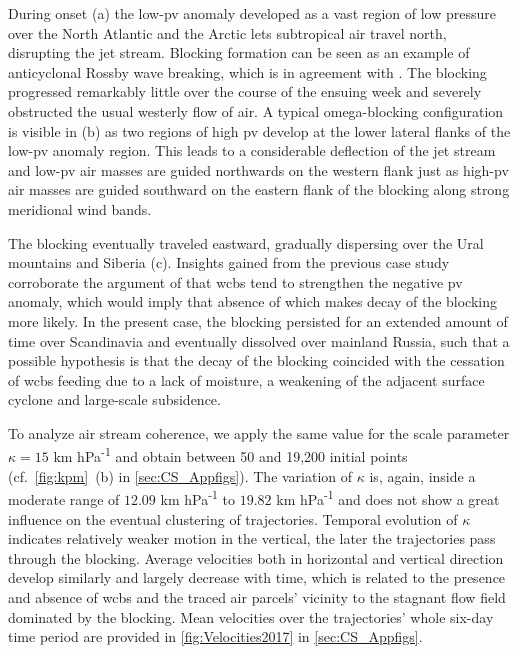 During onset (a) the low-\gls{pv} anomaly developed as a vast region of low pressure over the North Atlantic and the Arctic lets subtropical air travel north, disrupting the jet stream. Blocking formation can be seen as an example of anticyclonal Rossby wave breaking, which is in agreement with \textcite{millerNorthernHemisphereWinter2022}. The blocking progressed remarkably little over the course of the ensuing week and severely obstructed the usual westerly flow of air. A typical omega-blocking configuration is visible in (b) as two regions of high \gls{pv} develop at the lower lateral flanks of the low-\gls{pv} anomaly region. This leads to a considerable deflection of the jet stream and low-\gls{pv} air masses are guided northwards on the western flank just as high-\gls{pv} air masses are guided southward on the eastern flank of the blocking along strong meridional wind bands.

The blocking eventually traveled eastward, gradually dispersing over the Ural mountains and Siberia (c). Insights gained from the previous case study corroborate the argument of \textcite{steinfeldRoleLatentHeating2019} that \glspl{wcb} tend to strengthen the negative \gls{pv} anomaly, which would imply that absence of which makes decay of the blocking more likely. In the present case, the blocking persisted for an extended amount of time over Scandinavia and eventually dissolved over mainland Russia, such that a possible hypothesis is that the decay of the blocking coincided with the cessation of \glspl{wcb} feeding due to a lack of moisture, a weakening of the adjacent surface cyclone and large-scale subsidence.

To analyze air stream coherence, we apply the same value for the scale parameter $\kappa= 15$ km hPa\textsuperscript{-1} and obtain between 50 and 19,200 initial points (cf.~\cref{fig:kpm}~(b) in \cref{sec:CS_Appfigs}). The variation of $\kappa$ is, again, inside a moderate range of $12.09$ km hPa\textsuperscript{-1} to $19.82$ km hPa\textsuperscript{-1} and does not show a great influence on the eventual clustering of trajectories. Temporal evolution of $\kappa$ indicates relatively weaker motion in the vertical, the later the trajectories pass through the blocking. Average velocities both in horizontal and vertical direction develop similarly and largely decrease with time, which is related to the presence and absence of \glspl{wcb} and the traced air parcels' vicinity to the stagnant flow field dominated by the blocking. Mean velocities over the trajectories' whole six-day time period are provided in \cref{fig:Velocities2017} in \cref{sec:CS_Appfigs}.

